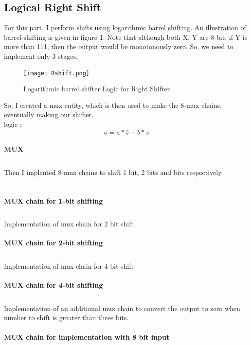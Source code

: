 \documentclass[12pt]{article}
\begin{document}
\subsection{Logical Right Shift}
For this part, I perform shifts using logarithmic barrel shifting. An illustration of barrel-shifting is given in figure 1. Note that although both X, Y are 8-bit, if Y is more than 111, then the output would be monotonously zero. So, we need to implement only 3 stages.\\
\begin{figure}[H]
\begin{center}
\texttt{[image: Rshift.png]}
\caption{Logarithmic barrel shifter Logic for Right Shifter}
\end{center}
\end{figure}
So, I created a mux entity, which is then used to make the 8-mux chains, eventually making our shifter.\\logic : \\ $$o = a*\bar{s} + b*s $$ \\
\textbf{MUX}
\inputminted[fontsize=\footnotesize,linenos,frame=lines
]{VHDL}{mux.vhd}

\noindent Then I implented 8-mux chains to shift 1 bit, 2 bits and  bits respectively.\\ \\ \\
\textbf{MUX chain for 1-bit shifting } 
\inputminted[fontsize=\footnotesize,linenos,frame=lines
]{VHDL}{mux_chain_1bit.vhd}
\noindent Implementation of mux chain for 2 bit shift\\ \\
\textbf{MUX chain for 2-bit shifting } 
\inputminted[fontsize=\footnotesize,linenos,frame=lines
]{VHDL}{mux_chain_2bit.vhd}

\noindent Implementation of mux chain for 4 bit shift\\ \\
\textbf{MUX chain for 4-bit shifting } 
\inputminted[fontsize=\footnotesize,linenos,frame=lines
]{VHDL}{mux_chain_4bit.vhd}

\noindent Implementation of an additional mux chain to convert the output to zero when number to shift is greater than three bits.\\ \\
\textbf{MUX chain for implementation with 8 bit input } 
\inputminted[fontsize=\footnotesize,linenos,frame=lines
]{VHDL}{mux_ALU.vhd}
\end{document}

